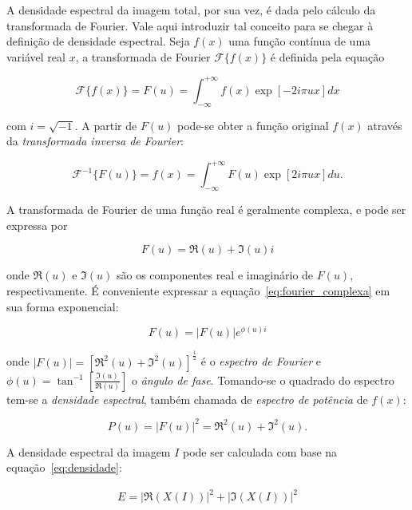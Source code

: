 A densidade espectral da imagem total, por sua vez, é dada pelo
cálculo da transformada de Fourier. Vale aqui introduzir tal conceito
para se chegar à definição de densidade espectral. Seja $f(x)$ uma
função contínua de uma variável real $x$, a transformada de Fourier
$\mathcal{F}\{f(x)\}$ é definida pela equação

\begin{equation}
  \mathcal{F}\{f(x)\} = F(u) = \int_{-\infty}^{+\infty} f(x) \exp[-2i\pi u x] dx
\end{equation}

\noindent com $i = \sqrt{-1}$. A partir de $F(u)$ pode-se obter a função
original $f(x)$ através da \emph{transformada inversa de Fourier}:

\begin{equation}
  \mathcal{F}^{-1}\{F(u)\} = f(x) = \int_{-\infty}^{+\infty} F(u) \exp[2i\pi u x] du.
\end{equation}

A transformada de Fourier de uma função real é geralmente complexa, e pode ser
expressa por

\begin{equation}
  F(u) = \Re(u) + \Im(u)i
  \label{eq:fourier_complexa}
\end{equation}

\noindent onde $\Re(u)$ e $\Im(u)$ são os componentes real e imaginário de
$F(u)$, respectivamente. É conveniente expressar a
equação~\ref{eq:fourier_complexa} em sua forma exponencial:

\begin{equation}
  F(u) = |F(u)|e^{\phi(u)i}
\end{equation}

\noindent onde $|F(u)| = \left[\Re^2(u) + \Im^2(u)\right]^{\frac{1}{2}}$ é o
\emph{espectro de Fourier} e
$\phi(u) = \tan^{-1}\left[\frac{\Im(u)}{\Re(u)}\right]$ o \emph{ângulo de
  fase}. Tomando-se o quadrado do espectro tem-se a \emph{densidade espectral},
também chamada de \emph{espectro de potência} de $f(x)$:

\begin{equation}
  P(u) = |F(u)|^2 = \Re^2(u) + \Im^2(u).
  \label{eq:densidade}
\end{equation}

A densidade espectral da imagem $I$ pode ser calculada com base na equação~\ref{eq:densidade}:

\begin{eqnarray}
  E = |\Re(X(I))|^2 + |\Im(X(I))|^2
\end{eqnarray}

